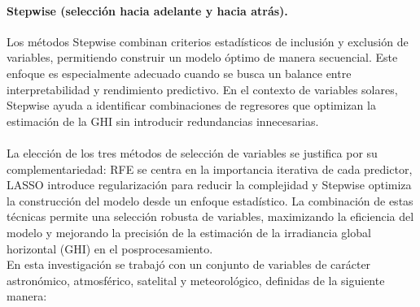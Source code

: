 \paragraph{Stepwise (selección hacia adelante y hacia atrás).} Los métodos Stepwise combinan criterios estadísticos de inclusión y exclusión de variables, permitiendo construir un modelo óptimo de manera secuencial. Este enfoque es especialmente adecuado cuando se busca un balance entre interpretabilidad y rendimiento predictivo. En el contexto de variables solares, Stepwise ayuda a identificar combinaciones de regresores que optimizan la estimación de la GHI sin introducir redundancias innecesarias.  

\paragraph{}  


La elección de los tres métodos de selección de variables se justifica por su complementariedad: RFE se centra en la importancia iterativa de cada predictor, LASSO introduce regularización para reducir la complejidad y Stepwise optimiza la construcción del modelo desde un enfoque estadístico. La combinación de estas técnicas permite una selección robusta de variables, maximizando la eficiencia del modelo y mejorando la precisión de la estimación de la irradiancia global horizontal (GHI) en el posprocesamiento.\\

En esta investigación se trabajó con un conjunto de variables de carácter astronómico, atmosférico, satelital y meteorológico, definidas de la siguiente manera: 

